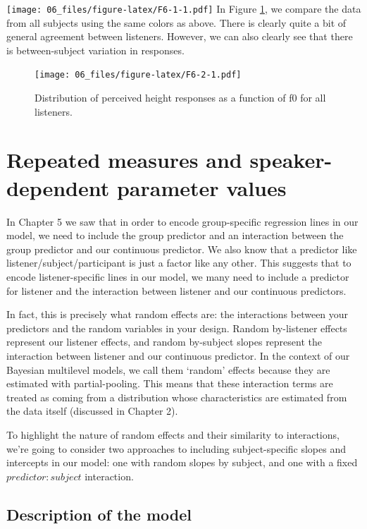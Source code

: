 \documentclass[
]{book}
\begin{document}
\texttt{[image: 06\_files/figure-latex/F6-1-1.pdf]}
In Figure \ref{fig:F6-2}, we compare the data from all subjects using the same colors as above. There is clearly quite a bit of general agreement between listeners. However, we can also clearly see that there is between-subject variation in responses.

\begin{figure}
\centering
\texttt{[image: 06\_files/figure-latex/F6-2-1.pdf]}
\caption{\label{fig:F6-2}Distribution of perceived height responses as a function of f0 for all listeners.}
\end{figure}

\hypertarget{repeated-measures-and-speaker-dependent-parameter-values}{%
\section{Repeated measures and speaker-dependent parameter values}\label{repeated-measures-and-speaker-dependent-parameter-values}}

In Chapter 5 we saw that in order to encode group-specific regression lines in our model, we need to include the group predictor and an interaction between the group predictor and our continuous predictor. We also know that a predictor like listener/subject/participant is just a factor like any other. This suggests that to encode listener-specific lines in our model, we many need to include a predictor for listener and the interaction between listener and our continuous predictors.

In fact, this is precisely what random effects are: the interactions between your predictors and the random variables in your design. Random by-listener effects represent our listener effects, and random by-subject slopes represent the interaction between listener and our continuous predictor. In the context of our Bayesian multilevel models, we call them `random' effects because they are estimated with partial-pooling. This means that these interaction terms are treated as coming from a distribution whose characteristics are estimated from the data itself (discussed in Chapter 2).

To highlight the nature of random effects and their similarity to interactions, we're going to consider two approaches to including subject-specific slopes and intercepts in our model: one with random slopes by subject, and one with a fixed \(predictor \colon subject\) interaction.

\hypertarget{description-of-the-model-7}{%
\subsection{Description of the model}\label{description-of-the-model-7}}
\end{document}
